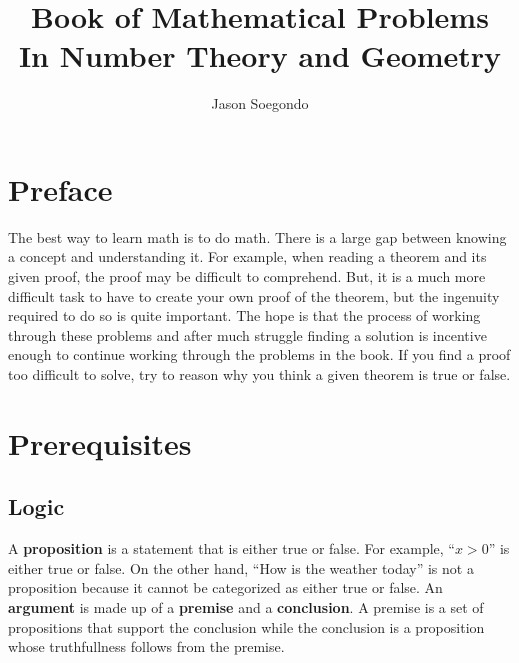 \documentclass[12pt]{report}
\title{\Huge{\textbf{Book of Mathematical Problems}}\\In Number Theory and Geometry}
\author{\huge{Jason Soegondo}}
\date{}
\begin{document}
\maketitle
\newpage%
\tableofcontents
\pagebreak
\doublespacing

\chapter{Preface}

\hspace{\parindent}The best way to learn math is to do math. There is a large gap between knowing a concept and understanding it. For example, when reading a theorem and its given proof, the proof may be difficult to comprehend. But, it is a much more difficult task to have to create your own proof of the theorem, but the ingenuity required to do so is quite important. The hope is that the process of working through these problems and after much struggle finding a solution is incentive enough to continue working through the problems in the book. If you find a proof too difficult to solve, try to reason why you think a given theorem is true or false.\\

\newpage
\chapter{Prerequisites}

\newpage

\section{Logic}

\hspace{\parindent}A \textbf{proposition} is a statement that is either true or false. For example, ``$x>0$'' is either true or false. On the other hand,  ``How is the weather today'' is not a proposition because it cannot be categorized as either true or false. An \textbf{argument} is made up of a \textbf{premise} and a \textbf{conclusion}. A premise is a set of propositions that support the conclusion while the conclusion is a proposition whose truthfullness follows from the premise.
\end{document}
